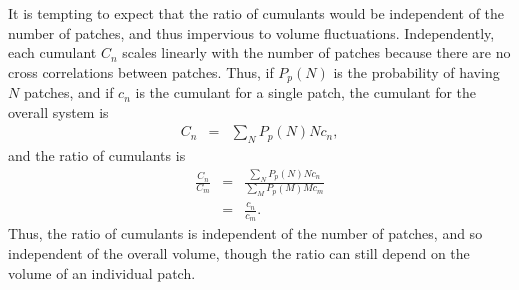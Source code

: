 It is tempting to expect that the ratio of cumulants would be independent of the number of patches, and thus impervious to volume fluctuations. Independently, each cumulant $C_n$ scales linearly with the number of patches because there are no cross correlations between patches. Thus,
if $P_p(N)$ is the probability of having $N$ patches, and if $c_n$ is the cumulant for a single patch, the cumulant for the overall system is
\begin{eqnarray}
\label{eq:patchprob}
C_n&=&\sum_NP_p(N) Nc_n,
\end{eqnarray}
and the ratio of cumulants is 
\begin{eqnarray}
\frac{C_n}{C_m}&=&\frac{\sum_NP_p(N)Nc_n}{\sum_MP_p(M)Mc_m}\\
\nonumber
&=&\frac{c_n}{c_m}.
\end{eqnarray}
Thus, the ratio of cumulants is independent of the number of patches, and so independent of the overall volume, though the ratio can still depend on the volume of an individual patch.

